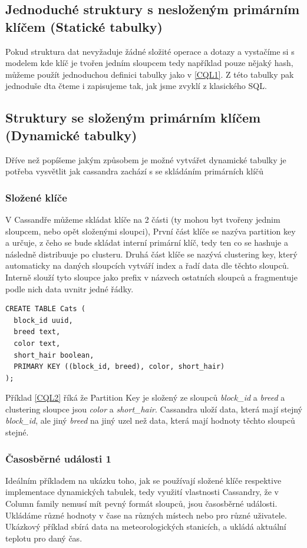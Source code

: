 \documentclass[thesis=M,czech]{FITthesis}[2012/06/26]
\begin{document}
\subsection{Jednoduché struktury s nesloženým primárním klíčem (Statické tabulky)}

Pokud struktura dat nevyžaduje žádné složité operace a dotazy a vystačíme si s modelem kde klíč je tvořen jedním sloupcem tedy například pouze nějaký hash, můžeme použít jednoduchou definici tabulky jako v \ref{CQL1}. Z této tabulky pak jednoduše dta čteme i zapisujeme tak, jak jsme zvyklí z klasického SQL.

\subsection{Struktury se složeným primárním klíčem (Dynamické tabulky)}

Dříve než popíšeme jakým způsobem je možné vytvářet dynamické tabulky je potřeba vysvětlit jak cassandra zachází s se skládáním primárních klíčů

\subsubsection*{Složené klíče}
V Cassandře můžeme skládat klíče na 2 části (ty mohou byt tvořeny jednim sloupcem, nebo opět složenými sloupci), První část klíče se nazýva partition key a určuje, z čeho se bude skládat interní primární klíč, tedy ten co se hashuje a následně distribuuje po clusteru. Druhá část klíče se nazývá clustering key, který automaticky na daných sloupcích vytváří index a řadí data dle těchto sloupců. Interně slouží tyto sloupce jako prefix v názvech ostatních sloupců a fragmentuje podle nich data uvnitr jedné řádky. 

\begin{lstlisting}[caption={Ukázka složených klíčů},label=CQL2]
CREATE TABLE Cats (
  block_id uuid,
  breed text,
  color text,
  short_hair boolean,
  PRIMARY KEY ((block_id, breed), color, short_hair)
);
\end{lstlisting}

Příklad \ref{CQL2} říká že Partition Key je složený ze sloupců \emph{block\_id} a  \emph{breed} a clustering sloupce jsou \emph{color} a \emph{short\_hair}. Cassandra uloží data, která mají stejný \emph{block\_id}, ale jiný \emph{breed} na jiný uzel než data, která mají hodnoty těchto sloupců stejné.  


\subsubsection*{Časosběrné události 1}
Ideálním příkladem na ukázku toho, jak se používají složené klíče respektive implementace dynamických tabulek, tedy využití vlastnosti Cassandry, že v Column family nemusí mít pevný formát sloupců, jsou časosběrné události. Ukládáme různé hodnoty v čase na různých místech nebo pro různé uživatele. Ukázkový příklad sbírá data na meteorologických stanicích, a ukládá aktuální teplotu pro daný čas.
\end{document}
